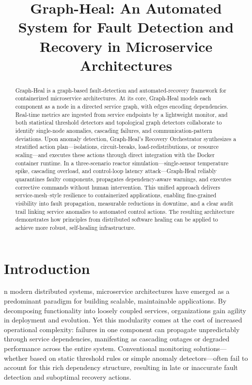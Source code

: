 \documentclass[11pt,conference]{IEEEtran}
\begin{document}
\title{Graph-Heal: An Automated System for Fault Detection and Recovery in Microservice Architectures}
\author{
}
\maketitle
\begin{abstract}
Graph-Heal is a graph-based fault-detection and automated-recovery framework for containerized microservice architectures. At its core, Graph-Heal models each component as a node in a directed service graph, with edges encoding dependencies. Real-time metrics are ingested from service endpoints by a lightweight monitor, and both statistical threshold detectors and topological graph detectors collaborate to identify single-node anomalies, cascading failures, and communication-pattern deviations. Upon anomaly detection, Graph-Heal's Recovery Orchestrator synthesizes a stratified action plan—isolations, circuit-breaks, load-redistributions, or resource scaling—and executes these actions through direct integration with the Docker container runtime. In a three-scenario reactor simulation—single-sensor temperature spike, cascading overload, and control-loop latency attack—Graph-Heal reliably quarantines faulty components, propagates dependency-aware warnings, and executes corrective commands without human intervention. This unified approach delivers service-mesh–style resilience to containerized applications, enabling fine-grained visibility into fault propagation, measurable reductions in downtime, and a clear audit trail linking service anomalies to automated control actions. The resulting architecture demonstrates how principles from distributed software healing can be applied to achieve more robust, self-healing infrastructure.
\end{abstract}

\section{Introduction}
n modern distributed systems, microservice architectures have emerged as a predominant paradigm for building scalable, maintainable applications. By decomposing functionality into loosely coupled services, organizations gain agility in deployment and evolution. Yet this modularity comes at the cost of increased operational complexity: failures in one component can propagate unpredictably through service dependencies, manifesting as cascading outages or degraded performance across the entire system. Conventional monitoring solutions—whether based on static threshold rules or simple anomaly detectors—often fail to account for this rich dependency structure, resulting in late or inaccurate fault detection and suboptimal recovery actions.
\end{document}
